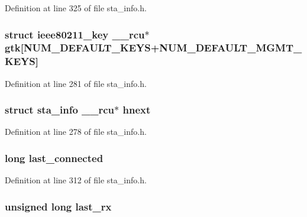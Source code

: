 Definition at line 325 of file sta\-\_\-info.\-h.

\hypertarget{structsta__info_ac5aa183bc3b32140826a8d0fcbad185e}{
\subsubsection[{gtk}]{\setlength{\rightskip}{0pt plus 5cm}struct {\bf ieee80211\-\_\-key} \-\_\-\-\_\-rcu$\ast$ gtk\mbox{[}{\bf N\-U\-M\-\_\-\-D\-E\-F\-A\-U\-L\-T\-\_\-\-K\-E\-Y\-S}+{\bf N\-U\-M\-\_\-\-D\-E\-F\-A\-U\-L\-T\-\_\-\-M\-G\-M\-T\-\_\-\-K\-E\-Y\-S}\mbox{]}}}\label{structsta__info_ac5aa183bc3b32140826a8d0fcbad185e}


Definition at line 281 of file sta\-\_\-info.\-h.

\hypertarget{structsta__info_aa178703df252667045be48a8874eec89}{
\subsubsection[{hnext}]{\setlength{\rightskip}{0pt plus 5cm}struct {\bf sta\-\_\-info} \-\_\-\-\_\-rcu$\ast$ hnext}}\label{structsta__info_aa178703df252667045be48a8874eec89}


Definition at line 278 of file sta\-\_\-info.\-h.

\hypertarget{structsta__info_a53686acd631d8f635a4c945952904896}{
\subsubsection[{last\-\_\-connected}]{\setlength{\rightskip}{0pt plus 5cm}long last\-\_\-connected}}\label{structsta__info_a53686acd631d8f635a4c945952904896}


Definition at line 312 of file sta\-\_\-info.\-h.

\hypertarget{structsta__info_a2e9fc210260fb987fa6b767ef12930e7}{
\subsubsection[{last\-\_\-rx}]{\setlength{\rightskip}{0pt plus 5cm}unsigned long last\-\_\-rx}}\label{structsta__info_a2e9fc210260fb987fa6b767ef12930e7}


